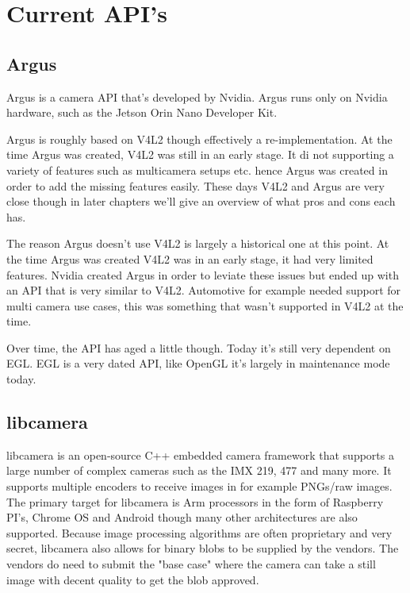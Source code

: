 \chapter{Current API's\label{currentAPIs}}
\section{Argus}

Argus is a camera API that's developed by Nvidia. Argus runs only on Nvidia
hardware, such as the Jetson Orin Nano Developer Kit.

Argus is roughly based on V4L2 though effectively a re-implementation. At the
time Argus was created, V4L2 was still in an early stage. It di not supporting
a variety of features such as multicamera setups etc. hence Argus was created
in order to add the missing features easily. These days V4L2 and Argus are very
close though in later chapters we'll give an overview of what pros and cons
each has.

The reason Argus doesn't use V4L2 is largely a historical one at this point.
At the time Argus was created V4L2 was in an early stage, it had very limited
features. Nvidia created Argus in order to leviate these issues but ended up
with an API that is very similar to V4L2. Automotive for example needed support
for multi camera use cases, this was something that wasn't supported in V4L2 at
the time.

Over time, the API has aged a little though. Today it's still very dependent on
EGL. EGL is a very dated API, like OpenGL it's largely in maintenance mode
today.

\section{libcamera}
libcamera is an open-source C++ embedded camera framework that supports a large
number of complex cameras such as the IMX 219, 477 and many more. It supports
multiple encoders to receive images in for example PNGs/raw images. The primary
target for libcamera is Arm processors in the form of Raspberry PI's, Chrome OS
and Android though many other architectures are also supported\cite{libcameraStack}.
Because image processing algorithms are often proprietary and very secret,
libcamera also allows for binary blobs to be supplied by the vendors. The
vendors do need to submit the "base case" where the camera can take a still
image with decent quality to get the blob approved.

